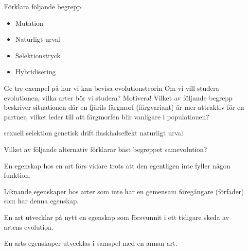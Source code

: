 \documentclass{exam}
\begin{document}
\vspace{5mm} %
\begin{center}
\end{center}
\vspace{5mm} %
\begin{questions}
\question Förklara följande begrepp

\begin{itemize}
  \item Mutation 
  \vspace{10mm}
  \item Naturligt urval
  \vspace{10mm}
  \item Selektionstryck
  \vspace{10mm}
  \item Hybridisering
\end{itemize}
\vspace{10mm} %
\question
Ge tre exempel på hur vi kan bevisa evolutionsteorin
\vspace{30mm} 
\question
Om vi vill studera evolutionen, vilka arter bör vi studera? Motivera!
\vspace{30mm} 
\question
Vilket av följande begrepp beskriver situationen där en fjärils färgmorf (färgvariant) är mer attraktiv för en partner, vilket leder till att färgmorfen blir vanligare i populationen?
\vspace{5mm}
\begin{checkboxes}
    \choice sexuell selektion
    \choice genetisk drift
    \choice flaskhalseffekt
    \choice naturligt urval
\end{checkboxes}
\break
\question 
Vilket av följande alternativ förklarar bäst begreppet samevolution?
\vspace{5mm}
\begin{checkboxes}
\choice En egenskap hos en art förs vidare trots att den egentligen inte fyller någon funktion.

\choice Liknande egenskaper hos arter som inte har en gemensam föregångare (förfader) som har denna egenskap.

\choice En art utvecklar på nytt en egenskap som försvunnit i ett tidigare skeda av artens evolution.

\choice En arts egenskaper utvecklas i samspel med en annan art.
\end{checkboxes}


\end{questions}
\end{document}
